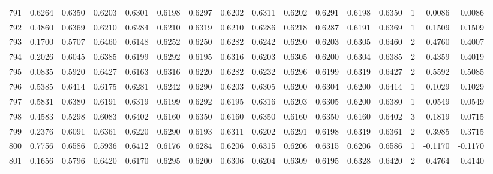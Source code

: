 \begin{tabular}{lrrrrrrrrrrrrrrr}
791 &      0.6264 &  0.6350 &  0.6203 &  0.6301 &  0.6198 &  0.6297 &  0.6202 &  0.6311 &  0.6202 &  0.6291 &   0.6198 &     0.6350 &      1 &                    0.0086 &                     0.0086 \\
792 &      0.4860 &  0.6369 &  0.6210 &  0.6284 &  0.6210 &  0.6319 &  0.6210 &  0.6286 &  0.6218 &  0.6287 &   0.6191 &     0.6369 &      1 &                    0.1509 &                     0.1509 \\
793 &      0.1700 &  0.5707 &  0.6460 &  0.6148 &  0.6252 &  0.6250 &  0.6282 &  0.6242 &  0.6290 &  0.6203 &   0.6305 &     0.6460 &      2 &                    0.4760 &                     0.4007 \\
794 &      0.2026 &  0.6045 &  0.6385 &  0.6199 &  0.6292 &  0.6195 &  0.6316 &  0.6203 &  0.6305 &  0.6200 &   0.6304 &     0.6385 &      2 &                    0.4359 &                     0.4019 \\
795 &      0.0835 &  0.5920 &  0.6427 &  0.6163 &  0.6316 &  0.6220 &  0.6282 &  0.6232 &  0.6296 &  0.6199 &   0.6319 &     0.6427 &      2 &                    0.5592 &                     0.5085 \\
796 &      0.5385 &  0.6414 &  0.6175 &  0.6281 &  0.6242 &  0.6290 &  0.6203 &  0.6305 &  0.6200 &  0.6304 &   0.6200 &     0.6414 &      1 &                    0.1029 &                     0.1029 \\
797 &      0.5831 &  0.6380 &  0.6191 &  0.6319 &  0.6199 &  0.6292 &  0.6195 &  0.6316 &  0.6203 &  0.6305 &   0.6200 &     0.6380 &      1 &                    0.0549 &                     0.0549 \\
798 &      0.4583 &  0.5298 &  0.6083 &  0.6402 &  0.6160 &  0.6350 &  0.6160 &  0.6350 &  0.6160 &  0.6350 &   0.6160 &     0.6402 &      3 &                    0.1819 &                     0.0715 \\
799 &      0.2376 &  0.6091 &  0.6361 &  0.6220 &  0.6290 &  0.6193 &  0.6311 &  0.6202 &  0.6291 &  0.6198 &   0.6319 &     0.6361 &      2 &                    0.3985 &                     0.3715 \\
800 &      0.7756 &  0.6586 &  0.5936 &  0.6412 &  0.6176 &  0.6284 &  0.6206 &  0.6315 &  0.6206 &  0.6315 &   0.6206 &     0.6586 &      1 &                   -0.1170 &                    -0.1170 \\
801 &      0.1656 &  0.5796 &  0.6420 &  0.6170 &  0.6295 &  0.6200 &  0.6306 &  0.6204 &  0.6309 &  0.6195 &   0.6328 &     0.6420 &      2 &                    0.4764 &                     0.4140 \\

\end{tabular}
